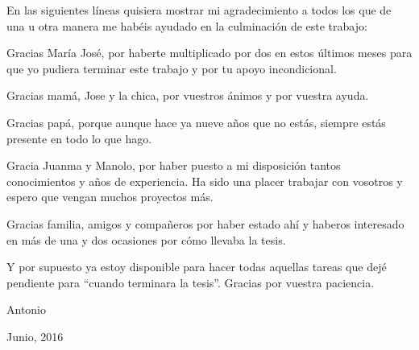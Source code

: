 


\begin{acknowledgements}      

En las siguientes líneas quisiera mostrar mi agradecimiento a todos los que de una u otra manera me habéis ayudado en la culminación de este trabajo:

Gracias María José, por haberte multiplicado por dos en estos últimos meses para que yo pudiera terminar este trabajo y por tu apoyo incondicional.

Gracias mamá, Jose y la chica, por vuestros ánimos y por vuestra ayuda.

Gracias papá, porque aunque hace ya nueve años que no estás, siempre estás presente en todo lo que hago. 

Gracia Juanma y Manolo, por haber puesto a mi disposición tantos conocimientos y años de experiencia. Ha sido una placer trabajar con vosotros y espero que vengan muchos proyectos más.

Gracias familia, amigos y compañeros por haber estado ahí y haberos interesado en más de una y dos ocasiones por cómo llevaba la tesis.

Y por supuesto ya estoy disponible para hacer todas aquellas tareas que dejé pendiente para ``cuando terminara la tesis''. Gracias por vuestra paciencia.


\begin{flushright}

Antonio

Junio, 2016







\end{flushright}



\end{acknowledgements}



